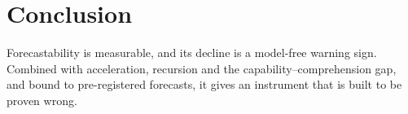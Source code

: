 \documentclass[11pt]{article}
\begin{document}
\section{Conclusion}
Forecastability is measurable, and its decline is a model-free warning sign.
Combined with acceleration, recursion and the capability--comprehension gap, and
bound to pre-registered forecasts, it gives an instrument that is built to be
proven wrong.



\end{document}
